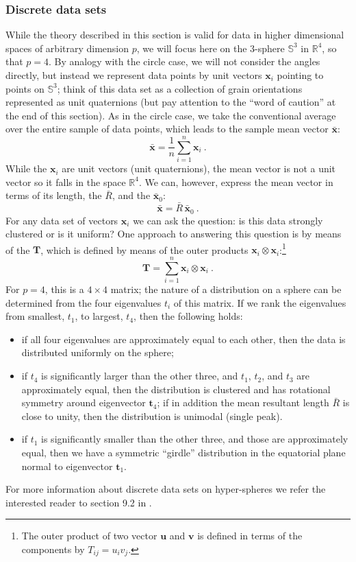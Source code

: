 \subsubsection{Discrete data sets}
While the theory described in this section is valid for data in higher dimensional spaces of arbitrary dimension $p$, we will focus here on the $3$-sphere $\mathbb{S}^3$ in $\mathbb{R}^4$, so that $p=4$.  By analogy with the circle case, we will not consider the angles directly, but instead we represent data points by unit vectors $\mathbf{x}_i$ pointing to points on $\mathbb{S}^3$; think of this data set as a collection of grain orientations represented as unit quaternions (but pay attention to the ``word of caution'' at the end of this section).  As in the circle case, we take the conventional average over the entire sample of data points, which leads to the sample mean vector 
$\bar{\mathbf{x}}$:
\begin{equation}
	\bar{\mathbf{x}} = \frac{1}{n}\sum_{i=1}^n \mathbf{x}_i\ .\label{\chabbr:eq:regularaverage}
\end{equation}
While the $\mathbf{x}_i$ are unit vectors (unit quaternions), the mean vector is not a unit vector so it falls in the space $\mathbb{R}^4$.  We can, however, express the mean vector in terms of its length, the  $\bar{R}$, and the  $\bar{\mathbf{x}}_0$: 
\[
	\bar{\mathbf{x}} = \bar{R}\, \bar{\mathbf{x}}_0\ .
\] 
For any data set of vectors $\mathbf{x}_i$ we can ask the question: is this data strongly clustered or is it uniform?  One approach to answering this question is by means of the  $\mathbf{T}$, which is defined by means of the outer products $\mathbf{x}_i\otimes \mathbf{x}_i$:\footnote{The outer product of two vector $\mathbf{u}$ and $\mathbf{v}$ is defined in terms of the components by $T_{ij} = u_iv_j$.}
\[
	\mathbf{T} = \sum_{i=1}^n \mathbf{x}_i\otimes \mathbf{x}_i\ .
\]
For $p=4$, this is a $4\times 4$ matrix; the nature of a distribution on a sphere can be determined from the four eigenvalues $t_i$ of this matrix. If we rank the eigenvalues from smallest, $t_1$, to largest, $t_4$, then the following holds: 
\begin{itemize}
\item if all four eigenvalues are approximately equal to each other, then the data is distributed uniformly on the sphere;
\item if $t_4$ is significantly larger than the other three, and $t_1$, $t_2$, and $t_3$ are approximately equal, then the distribution is clustered and has rotational symmetry around eigenvector $\mathbf{t}_4$; if in addition the mean resultant length $\bar{R}$ is close to unity, then the distribution is unimodal (single peak).
\item if $t_1$ is significantly smaller than the other three, and those are approximately equal, then we have a symmetric ``girdle'' distribution in the equatorial plane normal to eigenvector $\mathbf{t}_1$.
\end{itemize}
For more information about discrete data sets on hyper-spheres we refer the interested reader to section 9.2 in \cite{mardia2009a}.  


